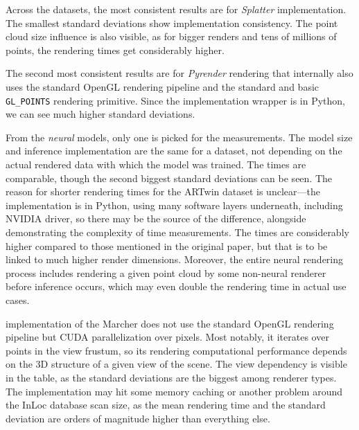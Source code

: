 Across the datasets, the most consistent results are for \CC{} \emph{Splatter}
implementation. The smallest standard deviations show
implementation consistency. The point cloud size influence is also visible,
as for bigger renders and tens of millions of points, the rendering times
get considerably higher.

The second most consistent results are for
\emph{Pyrender} rendering that internally also uses the standard OpenGL
rendering pipeline and the standard and basic \verb|GL_POINTS| rendering
primitive. Since the implementation wrapper is in Python, we can see much
higher standard deviations.

From the \emph{neural} models, only one is picked for the measurements.
The model size and inference implementation are the same for a dataset, not
depending on the actual rendered data with which the model was trained. The times
are comparable, though the second biggest standard deviations can be seen.
The reason for shorter rendering times for the ARTwin dataset is unclear---the
implementation is in Python, using many software layers underneath, including
NVIDIA driver, so there may be the source of the difference,
alongside demonstrating the complexity of time measurements. The times
are considerably higher compared to those mentioned in the original paper,
but that is to be linked to much higher render dimensions. Moreover, the entire
neural rendering process includes rendering a given point cloud by some
non-neural renderer before inference occurs, which may even double the
rendering time in actual use cases.

\CC{} implementation of the Marcher does not use the standard OpenGL rendering
pipeline but CUDA parallelization over pixels. Most notably, it
iterates over points in the view frustum, so its rendering computational
performance depends on the 3D structure of a given view of the scene. The
view dependency is  visible in the table, as the standard deviations are
the biggest among renderer types. The implementation may hit some memory
caching or another problem around the InLoc database scan size, as the mean
rendering time and the standard deviation are orders
of magnitude higher than everything else.



